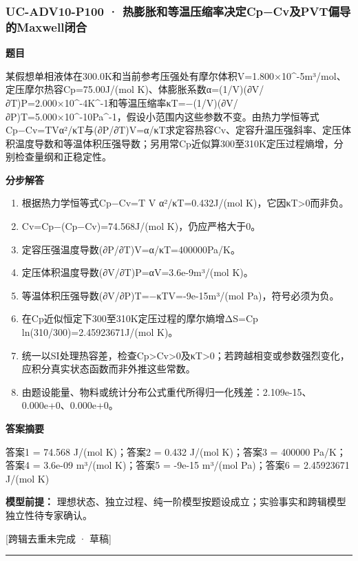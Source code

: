 \documentclass[UTF8,11pt,a4paper]{ctexart}
\begin{document}
\subsubsection*{UC-ADV10-P100 · 热膨胀和等温压缩率决定Cp−Cv及PVT偏导的Maxwell闭合}
\noindent\textbf{题目}\par
某假想单相液体在300.0K和当前参考压强处有摩尔体积V=1.800×10\textasciicircum{}-5m³/mol、定压摩尔热容Cp=75.00J/(mol K)、体膨胀系数α=(1/V)(∂V/∂T)P=2.000×10\textasciicircum{}-4K\textasciicircum{}-1和等温压缩率κT=−(1/V)(∂V/∂P)T=5.000×10\textasciicircum{}-10Pa\textasciicircum{}-1，假设小范围内这些参数不变。由热力学恒等式Cp−Cv=TVα²/κT与(∂P/∂T)V=α/κT求定容热容Cv、定容升温压强斜率、定压体积温度导数和等温体积压强导数；另用常Cp近似算300至310K定压过程熵增，分别检查量纲和正稳定性。\par
\medskip\noindent\textbf{分步解答}
\begin{enumerate}
\item 根据热力学恒等式Cp−Cv=T V α²/κT=0.432J/(mol K)，它因κT>0而非负。
\item Cv=Cp−(Cp−Cv)=74.568J/(mol K)，仍应严格大于0。
\item 定容压强温度导数(∂P/∂T)V=α/κT=400000Pa/K。
\item 定压体积温度导数(∂V/∂T)P=αV=3.6e-9m³/(mol K)。
\item 等温体积压强导数(∂V/∂P)T=−κTV=-9e-15m³/(mol Pa)，符号必须为负。
\item 在Cp近似恒定下300至310K定压过程的摩尔熵增ΔS=Cp ln(310/300)=2.45923671J/(mol K)。
\item 统一以SI处理热容差，检查Cp>Cv>0及κT>0；若跨越相变或参数强烈变化，应积分真实状态函数而非外推这些常数。
\item 由题设能量、物料或统计分布公式重代所得归一化残差：2.109e-15、0.000e+0、0.000e+0。
\end{enumerate}
\noindent\textbf{答案摘要}\par
答案1 = 74.568 J/(mol K)；答案2 = 0.432 J/(mol K)；答案3 = 400000 Pa/K；答案4 = 3.6e-09 m³/(mol K)；答案5 = -9e-15 m³/(mol Pa)；答案6 = 2.45923671 J/(mol K)\par
\noindent\textbf{模型前提：}
理想状态、独立过程、纯一阶模型按题设成立；实验事实和跨辑模型独立性待专家确认。\par
\noindent\textcolor{red!65!black}{[跨辑去重未完成 · 草稿]} \par
\medskip\hrule\medskip
{}
\end{document}
